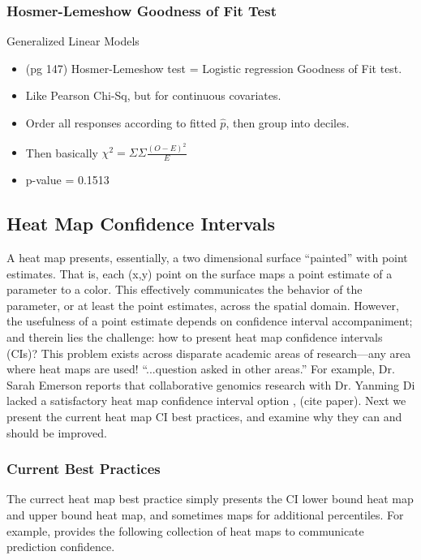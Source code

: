 \subsubsection{Hosmer-Lemeshow Goodness of Fit Test} %

Generalized Linear Models \citep{Myers2012}

  \begin{itemize} %
  \item (pg 147) Hosmer-Lemeshow test = Logistic regression Goodness of Fit test.
  \item Like Pearson Chi-Sq, but for continuous covariates.
  \item Order all responses according to fitted $\hat{p}$, then group into deciles.
  \item Then basically $\chi^{2} = \Sigma \Sigma \frac{(O - E)^{2}}{E}$
  \item p-value = 0.1513
  \end{itemize}

\subsection{Heat Map Confidence Intervals}

A heat map presents, essentially, a two dimensional surface ``painted'' with point estimates. That is, each (x,y) point on the surface maps a point estimate of a parameter to a color. This effectively communicates the behavior of the parameter, or at least the point estimates, across the spatial domain. However, the usefulness of a point estimate depends on confidence interval accompaniment; and therein lies the challenge: how to present heat map confidence intervals (CIs)? This problem exists across disparate academic areas of research---any area where heat maps are used! ``...question asked in other areas.'' For example, Dr. Sarah Emerson reports that collaborative genomics research with Dr. Yanming Di lacked a satisfactory heat map confidence interval option \citep{Emerson}, (cite paper). Next we present the current heat map CI best practices, and examine why they can and should be improved.

\subsubsection{Current Best Practices}

The currect heat map best practice simply presents the CI lower bound heat map and upper bound heat map, and sometimes maps for additional percentiles. For example, \cite{Cross2015} provides the following collection of heat maps to communicate prediction confidence.

